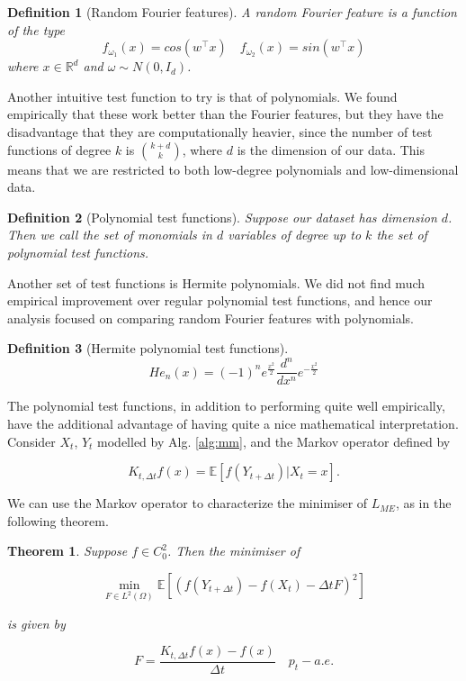 \documentclass[12pt]{article}
\theoremstyle{break}
\newtheorem{definition}{Definition}[section]
\newtheorem{theorem}{Theorem}[section]
\begin{document}
\begin{definition}[Random Fourier features]
	A random Fourier feature is a function of the type 
	\begin{equation*}
		f_{\omega_1}(x) = cos(w^\intercal x) \quad f_{\omega_2}(x) = sin(w^\intercal x)
	\end{equation*}
	where $x \in \mathbb{R}^d$ and $\omega \sim N(0, I_d)$.
\end{definition}

Another intuitive test function to try is that of polynomials. We found empirically that these work better than the Fourier features, but they have the disadvantage that they are computationally heavier, since the number of test functions of degree $k$ is ${k + d \choose k}$, where $d$ is the dimension of our data. This means that we are restricted to both low-degree polynomials and low-dimensional data.

\begin{definition}[Polynomial test functions]
	Suppose our dataset has dimension $d$. Then we call the set of monomials in $d$ variables of degree up to $k$ the set of polynomial test functions.
\end{definition}

Another set of test functions is Hermite polynomials. We did not find much empirical improvement over regular polynomial test functions, and hence our analysis focused on comparing random Fourier features with polynomials.

\begin{definition}[Hermite polynomial test functions]
	\begin{equation*}
		He_n(x) = (-1)^n e^{\frac{x^2}{2}}\frac{d^n}{dx^n}e^{-\frac{x^2}{2}}
	\end{equation*}
\end{definition}


The polynomial test functions, in addition to performing quite well empirically, have the additional advantage of having quite a nice mathematical interpretation. Consider $X_t$, $Y_t$ modelled by Alg. \ref{alg:mm}, and the Markov operator defined by

\begin{equation}
	K_{t,\Delta t} f(x) = \mathbb{E}[f(Y_{t+\Delta t})|X_t = x].
\end{equation}

We can use the Markov operator to characterize the minimiser of $L_{ME}$, as in the following theorem.

\begin{theorem}
	Suppose $f \in C^2_0$. Then the minimiser of

	\begin{equation}
		\min_{F \in L^2(\Omega)}\mathbb{E}[(f(Y_{t+\Delta t}) - f(X_t) - \Delta t F)^2]
	\end{equation}

	is given by

	\begin{equation}
		F = \frac{K_{t,\Delta t} f(x) - f(x)}{\Delta t} \quad p_t-a.e.
	\end{equation}
\end{theorem}
\end{document}
